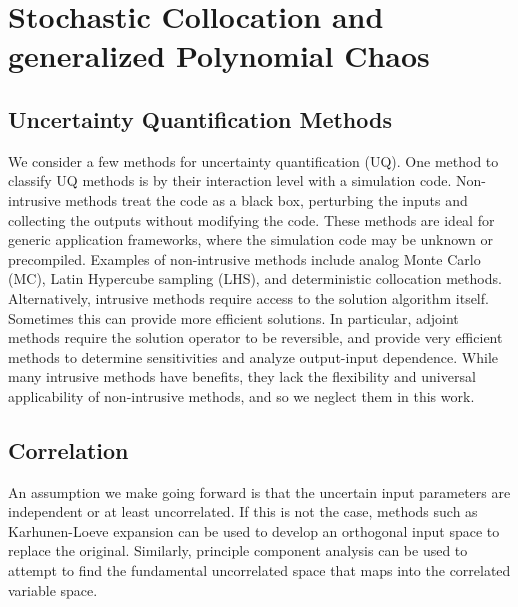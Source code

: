 
\chapter{Stochastic Collocation and generalized Polynomial Chaos} %

\label{Chapter3} %



\section{Uncertainty Quantification Methods}
We consider a few methods for uncertainty quantification (UQ).  One method to classify UQ methods is by their
interaction level with a simulation code.  Non-intrusive methods treat the code as a black box, perturbing the
inputs and collecting the outputs without modifying the code.  These methods are ideal for generic application
frameworks, where the simulation code may be unknown or precompiled.  Examples of non-intrusive methods
include analog Monte Carlo (MC), Latin Hypercube sampling (LHS), and deterministic collocation methods.
Alternatively, intrusive methods require access to the solution algorithm itself.  Sometimes this can provide
more efficient solutions.  In particular, adjoint methods require the solution operator to be reversible, and
provide very efficient methods to determine sensitivities and analyze output-input dependence.  While many
intrusive methods have benefits, they lack the flexibility and universal applicability of non-intrusive
methods, and so we neglect them in this work.

\section{Correlation}
An assumption we make going forward is that the uncertain input parameters are independent or at least
uncorrelated.  If this is not the case, methods such as Karhunen-Loeve expansion can be used to develop an orthogonal
input space to replace the original.  Similarly, principle component analysis can be used to attempt to find
the fundamental uncorrelated space that maps into the correlated variable space.

